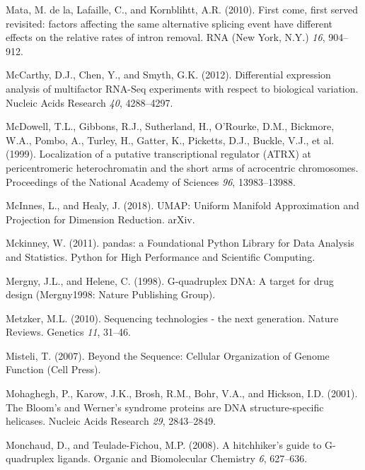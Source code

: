 \documentclass[12pt,a4paper,]{report}
\begin{document}
\leavevmode\hypertarget{ref-DelaMata2010}{}%
Mata, M. de la, Lafaille, C., and Kornblihtt, A.R. (2010). First come,
first served revisited: factors affecting the same alternative splicing
event have different effects on the relative rates of intron removal.
RNA (New York, N.Y.) \emph{16}, 904--912.

\leavevmode\hypertarget{ref-McCarthy2012}{}%
McCarthy, D.J., Chen, Y., and Smyth, G.K. (2012). Differential
expression analysis of multifactor RNA-Seq experiments with respect to
biological variation. Nucleic Acids Research \emph{40}, 4288--4297.

\leavevmode\hypertarget{ref-McDowell1999}{}%
McDowell, T.L., Gibbons, R.J., Sutherland, H., O'Rourke, D.M., Bickmore,
W.A., Pombo, A., Turley, H., Gatter, K., Picketts, D.J., Buckle, V.J.,
et al. (1999). Localization of a putative transcriptional regulator
(ATRX) at pericentromeric heterochromatin and the short arms of
acrocentric chromosomes. Proceedings of the National Academy of Sciences
\emph{96}, 13983--13988.

\leavevmode\hypertarget{ref-McInnes2018}{}%
McInnes, L., and Healy, J. (2018). UMAP: Uniform Manifold Approximation
and Projection for Dimension Reduction. arXiv.

\leavevmode\hypertarget{ref-Mckinney2011}{}%
Mckinney, W. (2011). pandas: a Foundational Python Library for Data
Analysis and Statistics. Python for High Performance and Scientific
Computing.

\leavevmode\hypertarget{ref-Mergny1998}{}%
Mergny, J.L., and Helene, C. (1998). G-quadruplex DNA: A target for drug
design (Mergny1998: Nature Publishing Group).

\leavevmode\hypertarget{ref-Metzker2010}{}%
Metzker, M.L. (2010). Sequencing technologies - the next generation.
Nature Reviews. Genetics \emph{11}, 31--46.

\leavevmode\hypertarget{ref-Misteli2007}{}%
Misteli, T. (2007). Beyond the Sequence: Cellular Organization of Genome
Function (Cell Press).

\leavevmode\hypertarget{ref-Mohaghegh2001}{}%
Mohaghegh, P., Karow, J.K., Brosh, R.M., Bohr, V.A., and Hickson, I.D.
(2001). The Bloom's and Werner's syndrome proteins are DNA
structure-specific helicases. Nucleic Acids Research \emph{29},
2843--2849.

\leavevmode\hypertarget{ref-Monchaud2008}{}%
Monchaud, D., and Teulade-Fichou, M.P. (2008). A hitchhiker's guide to
G-quadruplex ligands. Organic and Biomolecular Chemistry \emph{6},
627--636.
\end{document}
